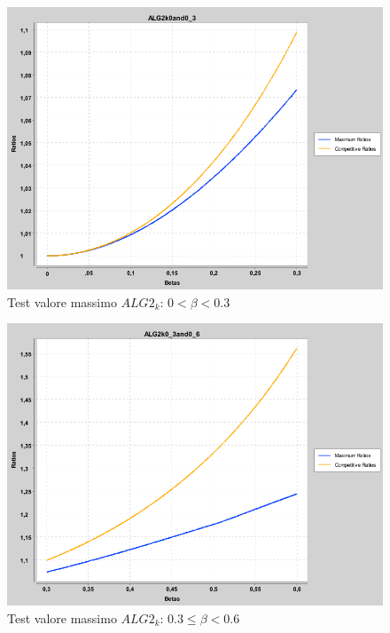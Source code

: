 \documentclass[twoside,openany,titlepage,fleqn,
	headinclude,12pt,a4paper,BCOR5mm,footinclude]{scrbook}
\begin{document}
\setcounter{figure}{0} 
\begin{figure}[H]
\caption{Test valore massimo $ALG2_{k}$: $0 < \beta < 0.3$}
\centering
\includegraphics[scale=0.4]{max/ALG2k0and0_3.png}
\end{figure}
\begin{figure}[H]
\caption{Test valore massimo $ALG2_{k}$: $0.3 \leq  \beta < 0.6$}
\centering
\includegraphics[scale=0.4]{max/ALG2k0_3and0_6.png}
\end{figure}
\end{document}
